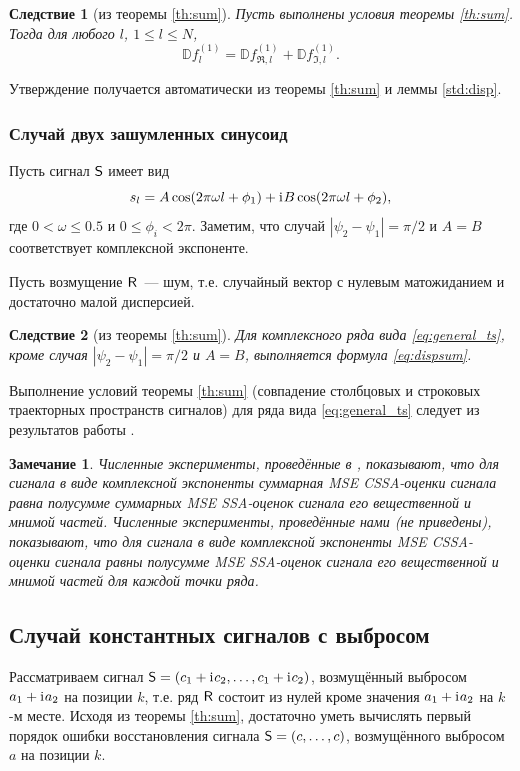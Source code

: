 \documentclass{spisok-article}
\newtheorem{corollary}{Следствие}%
\newtheorem{remark}{Замечание}%
\begin{document}
\begin{corollary}[из теоремы {\ref{th:sum}}] \label{st:dispsum}
	Пусть выполнены условия теоремы \ref{th:sum}.
	Тогда для любого $l$, $1\le l \le N$,
	\begin{equation} \label{eq:dispsum}
		\mathbb{D}f^{(1)}_l = \mathbb{D}f^{(1)}_{\Re, l} + \mathbb{D}f^{(1)}_{\Im, l}.	
	\end{equation}
\end{corollary}

Утверждение получается автоматически из теоремы \ref{th:sum} и леммы \ref{std:disp}.

\subsubsection{Случай двух зашумленных синусоид}
Пусть сигнал $\textsf{S}$ имеет вид
\begin{equation}
\label{eq:general_ts}
s_l = A\cos(2 \pi\omega l + \phi_1) + \mathrm{i}\mkern1mu B\cos(2 \pi\omega l + \phi_2),
\end{equation}
где $0<\omega\le 0.5$ и $0\le\phi_i < 2\pi$.
Заметим, что случай $|\psi_2-\psi_1| = \pi/2$ и $A=B$ соответствует комплексной экспоненте.

Пусть возмущение $\textsf{R}$~--- шум, т.е. случайный вектор с нулевым матожиданием и достаточно малой дисперсией.

\begin{corollary}[из теоремы {\ref{th:sum}}]
Для комплексного ряда вида \eqref{eq:general_ts}, кроме случая $|\psi_2-\psi_1| = \pi/2$ и $A=B$,  выполняется формула \eqref{eq:dispsum}.
\end{corollary}
Выполнение условий теоремы {\ref{th:sum}} (совпадение столбцовых и строковых траекторных пространств сигналов) для ряда вида \eqref{eq:general_ts} следует из результатов работы \cite{Golyandina.Stepanov2005}.

\begin{remark}
Численные эксперименты, проведённые в \cite{Golyandina.etal2013}, показывают, что для сигнала в виде комплексной экспоненты суммарная MSE CSSA-оценки сигнала равна полусумме суммарных MSE SSA-оценок сигнала его вещественной и мнимой частей.
Численные эксперименты, проведённые нами (не приведены), показывают, что для сигнала в виде комплексной экспоненты MSE CSSA-оценки сигнала равны полусумме MSE SSA-оценок сигнала его вещественной и мнимой частей для каждой точки ряда.
\end{remark}

\subsection{Случай константных сигналов с выбросом}
Рассматриваем сигнал $\textsf{S} = (c_1 + \mathrm{i}\mkern1mu c_2, \ldots, c_1 + \mathrm{i}\mkern1mu c_2)$, возмущённый выбросом $a_1 + \mathrm{i}\mkern1mu a_2$ на позиции $k$, т.е. ряд $\textsf{R}$ состоит из нулей кроме значения $a_1 + \mathrm{i}\mkern1mu a_2$ на $k$-м месте. Исходя из теоремы \ref{th:sum}, достаточно уметь вычислять первый порядок ошибки восстановления сигнала $\textsf{S} = (c, \ldots, c)$, возмущённого выбросом $a$ на позиции $k$.
\end{document}
